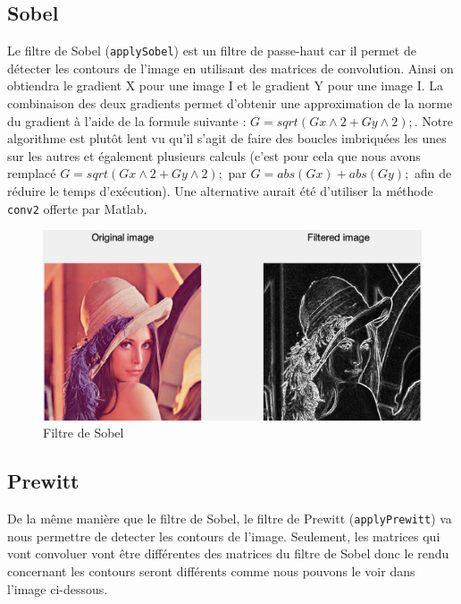 \documentclass[12pt,a4paper]{article}
\begin{document}
\subsection{Sobel}
Le filtre de Sobel (\texttt{applySobel}) est un filtre de passe-haut car il permet de détecter les contours de l'image en utilisant des matrices de convolution. Ainsi on obtiendra le gradient X pour une image I et le gradient Y pour une image I. La combinaison des deux gradients permet d'obtenir une approximation de la norme du gradient à l'aide de la formule suivante : \texttt{$ G = sqrt( Gx\wedge2 + Gy \wedge2 ); $}. Notre algorithme est plutôt lent vu qu'il s'agit de faire des boucles imbriquées les unes sur les autres et également plusieurs calculs (c'est pour cela que nous avons remplacé \texttt{$ G = sqrt( Gx\wedge2 + Gy \wedge2 ); $} par \texttt{$ G = abs(Gx) + abs(Gy); $} afin de réduire le temps d'exécution). Une alternative aurait été d'utiliser la méthode \texttt{conv2} offerte par Matlab.

\begin{figure}[H]
\centering
\includegraphics[scale=0.5]{img/sobel}
\caption{Filtre de Sobel}
\end{figure}

\subsection{Prewitt}
De la même manière que le filtre de Sobel, le filtre de Prewitt (\texttt{applyPrewitt}) va nous permettre de detecter les contours de l'image. Seulement, les matrices qui vont convoluer vont être différentes des matrices du filtre de Sobel donc le rendu concernant les contours seront différents comme nous pouvons le voir dans l'image ci-dessous.
\end{document}
